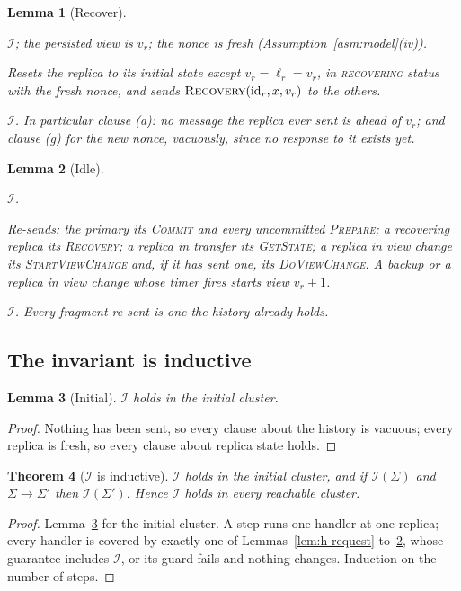 \documentclass[11pt,a4paper]{article}
\theoremstyle{plain}
\newtheorem{theorem}{Theorem}[section]
\newtheorem{lemma}[theorem]{Lemma}
\theoremstyle{definition}
\theoremstyle{remark}
\newcommand{\msg}[1]{\textsc{#1}}
\newcommand{\dvc}{\msg{DoViewChange}}
\newcommand{\Inv}{\mathcal{I}}
\newcommand{\recovering}{\textsc{recovering}}
\begin{document}
\begin{lemma}[Recover]
\label{lem:h-recover}
\begin{iface}
  \item[Precondition] $\Inv$; the persisted view is $v_r$; the nonce is
    fresh (Assumption~\ref{asm:model}(iv)).
  \item[Effect] Resets the replica to its initial state except
    $v_r = \ell_r = v_r$, in \recovering{} status with the fresh nonce,
    and sends $\msg{Recovery}(\mathrm{id}_r, x, v_r)$ to the others.
  \item[Guarantee] $\Inv$. In particular clause (a): no message the
    replica ever sent is ahead of $v_r$; and clause (g) for the new
    nonce, vacuously, since no response to it exists yet.
\end{iface}
\end{lemma}

\begin{lemma}[Idle]
\label{lem:h-idle}
\begin{iface}
  \item[Precondition] $\Inv$.
  \item[Effect] Re-sends: the primary its \msg{Commit} and every
    uncommitted \msg{Prepare}; a recovering replica its \msg{Recovery};
    a replica in transfer its \msg{GetState}; a replica in view change
    its \msg{StartViewChange} and, if it has sent one, its \dvc{}. A
    backup or
    a replica in view change whose timer fires starts view $v_r + 1$.
  \item[Guarantee] $\Inv$. Every fragment re-sent is one the history
    already holds.
\end{iface}
\end{lemma}

\subsection{The invariant is inductive}

\begin{lemma}[Initial]
\label{lem:init}
$\Inv$ holds in the initial cluster.
\end{lemma}
\begin{proof}
Nothing has been sent, so every clause about the history is vacuous;
every replica is fresh, so every clause about replica state holds.
\end{proof}

\begin{theorem}[$\Inv$ is inductive]
\label{thm:inductive}
$\Inv$ holds in the initial cluster, and if $\Inv(\Sigma)$ and
$\Sigma \to \Sigma'$ then $\Inv(\Sigma')$. Hence $\Inv$ holds in every
reachable cluster.
\end{theorem}
\begin{proof}
Lemma~\ref{lem:init} for the initial cluster. A step runs one handler at
one replica; every handler is covered by exactly one of
Lemmas~\ref{lem:h-request} to~\ref{lem:h-idle}, whose guarantee includes
$\Inv$, or its guard fails and nothing changes. Induction on the number
of steps.
\end{proof}
\end{document}
